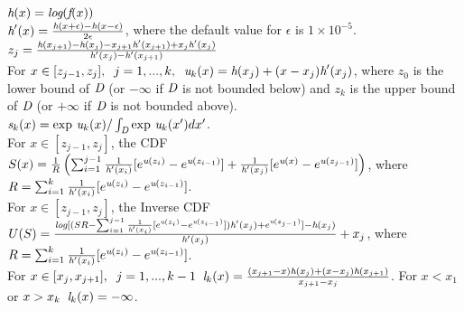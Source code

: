 \documentclass{article}\usepackage[]{graphicx}\usepackage[]{color}
\begin{document}
\pagestyle{fancy}


$\emph{h}(x) = \emph{log}(\emph{f}(x))$\\


$\emph{h}'(x) = \frac{\emph{h}(x + \epsilon) - \emph{h}(x - \epsilon)}{2\epsilon}$, where the default value for $\epsilon$ is $1 \times 10^{-5}$. \\



$z_{j} = \frac{\emph{h}(x_{j+1}) - \emph{h}(x_j) - x_{j+1}\emph{h}'(x_{j+1}) + x_{j}\emph{h}'(x_{j})}{\emph{h}'(x_{j}) - \emph{h}'(x_{j+1})}$\\



For $x \in [z_{j-1}, z_{j}], \; \; j = 1, ..., k, \; \; \emph{u}_{k}(x) = \emph{h}(x_{j}) + (x - x_{j})\emph{h}'(x_{j})$, where $z_{0}$ is the lower bound of $\emph{D}$ (or $-\infty$ if $\emph{D}$ is not bounded below) and $z_{k}$ is the upper bound of $\emph{D}$ (or $+\infty$ if $\emph{D}$ is not bounded above).\\



$\emph{s}_{k}(x) = \text{exp } \emph{u}_{k}(x)/\int_{\emph{D}} \text{exp } \emph{u}_{k}(x')dx'$. \\


For $x \in [z_{j-1}, z_{j}]$, the CDF $S(x) = \frac{1}{R} \left(\sum_{i=1}^{j-1} \frac{1}{\emph{h}'(x_{i})}[e^{\emph{u}(z_{i})} - e^{\emph{u}(z_{i-1})}] + \frac{1}{\emph{h}'(x_{j})}[e^{\emph{u}(x)} - e^{\emph{u}(z_{j-1})}]\right)$, where \\$R = \sum_{i=1}^{k}\frac{1}{\emph{h}'(x_{i})}[e^{\emph{u}(z_{i})} - e^{\emph{u}(z_{i-1})}]$.\\


For $x \in [z_{j-1}, z_{j}]$, the Inverse CDF $U(S) = \frac{\emph{log}[(SR - \sum_{i=1}^{j-1}\frac{1}{\emph{h}'(x_{i})}[e^{\emph{u}(z_{i})} - e^{\emph{u}(z_{i-1})}])\emph{h}'(x_{j}) + e^{\emph{u}(z_{j-1})}] - \emph{h}(x_{j})}{\emph{h}'(x_j)} + x_{j}$, where $R = \sum_{i=1}^{k}\frac{1}{\emph{h}'(x_{i})}[e^{\emph{u}(z_{i})} - e^{\emph{u}(z_{i-1})}]$.\\ 



For $x \in [x_{j}, x_{j+1}], \; \; j = 1, ..., k-1 \; \; \emph{l}_{k}(x) = \frac{(x_{j+1} - x)\emph{h}(x_{j}) + (x - x_{j})\emph{h}(x_{j+1})}{x_{j+1} - x_{j}}$. For $x < x_{1}$ or $x > x_{k} \; \;  \emph{l}_{k}(x) = -\infty$. 
\end{document}
